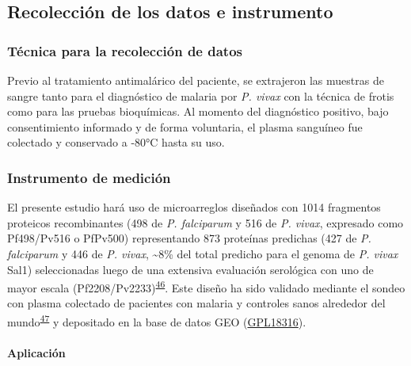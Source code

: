 \documentclass[a4paper]{article}
\let\oldparagraph\paragraph
\renewcommand{\paragraph}[1]{\oldparagraph{#1}\mbox{}}
\begin{document}
\subsection{Recolección de los datos e
instrumento}\label{recoleccion-de-los-datos-e-instrumento}

\subsubsection{Técnica para la recolección de
datos}\label{tecnica-para-la-recoleccion-de-datos}

Previo al tratamiento antimalárico del paciente, se extrajeron las
muestras de sangre tanto para el diagnóstico de malaria por \emph{P.
vivax} con la técnica de frotis como para las pruebas bioquímicas. Al
momento del diagnóstico positivo, bajo consentimiento informado y de
forma voluntaria, el plasma sanguíneo fue colectado y conservado a -80°C
hasta su uso.

\subsubsection{Instrumento de medición}\label{instrumento-de-medicion}

El presente estudio hará uso de microarreglos diseñados con 1014
fragmentos proteicos recombinantes (498 de \emph{P. falciparum} y 516 de
\emph{P. vivax}, expresado como Pf498/Pv516 o PfPv500) representando 873
proteínas predichas (427 de \emph{P. falciparum} y 446 de \emph{P.
vivax}, \textasciitilde{}8\% del total predicho para el genoma de
\emph{P. vivax} Sal1) seleccionadas luego de una extensiva evaluación
serológica con uno de mayor escala
(Pf2208/Pv2233)\textsuperscript{\protect\hyperlink{ref-Finney2014}{46}}.
Este diseño ha sido validado mediante el sondeo con plasma colectado de
pacientes con malaria y controles sanos alrededor del
mundo\textsuperscript{\protect\hyperlink{ref-King2015FOC}{47}} y
depositado en la base de datos GEO
(\href{https://www.ncbi.nlm.nih.gov/geo/query/acc.cgi?acc=GPL18316}{GPL18316}).

\paragraph{Aplicación}\label{aplicacion}
\end{document}
